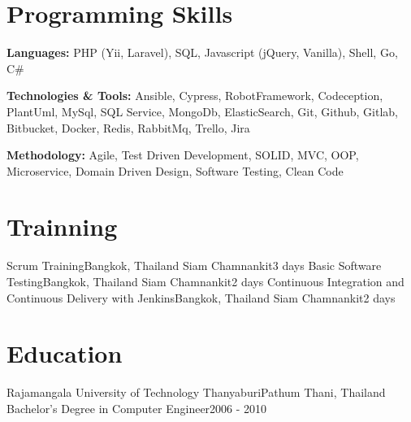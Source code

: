 \documentclass[letterpaper,11pt]{article}
\begin{document}
\resumeSubHeadingListEnd

%
\section{Programming Skills}
\resumeSubHeadingListStart
\item{
    \textbf{Languages:}
    {
        PHP (Yii, Laravel), SQL, Javascript (jQuery, Vanilla), Shell, Go, C\#
    }
}
\item{
    \textbf{Technologies \& Tools:}
    {
        Ansible, Cypress, RobotFramework, Codeception, PlantUml,
        MySql, SQL Service, MongoDb, ElasticSearch,
        Git, Github, Gitlab, Bitbucket, Docker, Redis, RabbitMq,
        Trello, Jira
    }
}
\item{
    \textbf{Methodology:}
    {
        Agile, Test Driven Development, SOLID, MVC, OOP,
        Microservice, Domain Driven Design, Software Testing, Clean Code
    }
}
\resumeSubHeadingListEnd


\section{Trainning}
\resumeSubHeadingListStart
\resumeSubheading
{Scrum Training}{Bangkok, Thailand}
{Siam Chamnankit}{3 days}
\resumeSubheading
{Basic Software Testing}{Bangkok, Thailand}
{Siam Chamnankit}{2 days}
\resumeSubheading
{Continuous Integration and Continuous Delivery with Jenkins}{Bangkok, Thailand}
{Siam Chamnankit}{2 days}
\resumeSubHeadingListEnd


\section{Education}
\resumeSubHeadingListStart
\resumeSubheading
{Rajamangala University of Technology Thanyaburi}{Pathum Thani, Thailand}
{Bachelor's Degree in Computer Engineer}{2006 - 2010}
\resumeSubHeadingListEnd

\end{document}
